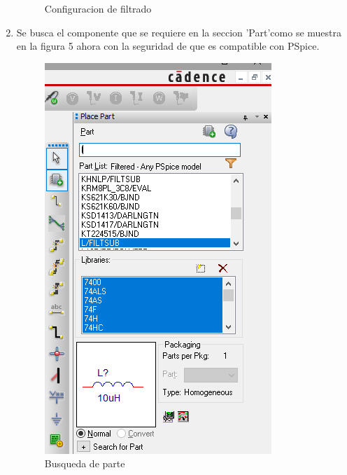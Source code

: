 \documentclass[letterpaper]{article}
\begin{document}
\begin{large}
\begin{enumerate}
\begin{figure}[htbp]
                \caption{Configuracion de filtrado}
                \label{fig:Configuracion de filtro}
            \end{figure} \newpage
            \item Se busca el componente que se requiere en la seccion 'Part'como se muestra en la figura 5 ahora con la seguridad de que es compatible con PSpice.\\
            \begin{figure}[htbp]
                \centering
                \includegraphics[scale=0.5]{cp2.png}
                \caption{Busqueda de parte}
                \label{fig:Busqueda de parte}

\end{figure}
\end{enumerate}
\end{large}
\end{document}
